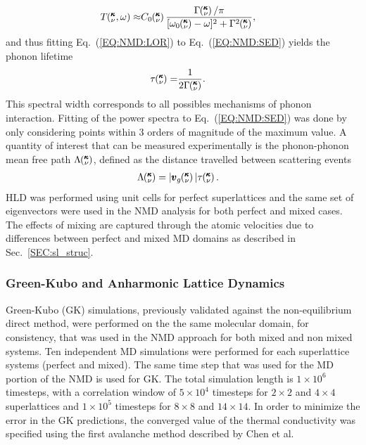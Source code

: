 \documentclass[aps,prb,preprint,preprintnumbers,amsmath,amssymb,floatfix,superscriptaddress]{revtex4}
\newcommand{\kvw}{\mspace{-4.0mu}\left(\mspace{-8.0mu}
\begin{smallmatrix}&\pmb{\kappa} \\&\nu\end{smallmatrix}
\mspace{-2.0mu},\omega\right)}
\newcommand{\kv}{\mspace{-4.0mu}\left(\mspace{-8.0mu}
\begin{smallmatrix}&\pmb{\kappa} \\&\nu\end{smallmatrix}
\mspace{-3.0mu}\right)}
\begin{document}
\begin{equation}\label{EQ:NMD:LOR}
\begin{split}
T\kvw\approx&C_0\kv\frac{\Gamma\kv/\pi}{[\omega_0\kv-\omega]^2+\Gamma^2\kv},
\end{split}
\end{equation}
and thus fitting Eq.~(\ref{EQ:NMD:LOR}) to Eq.~(\ref{EQ:NMD:SED}) yields the phonon lifetime
\begin{equation}\label{EQ:lifetime}
\begin{split}
\tau\kv=&\frac{1}{2\Gamma\kv}.
\end{split}
\end{equation}
This spectral width corresponds to all possibles mechanisms of phonon interaction. Fitting of the power spectra to Eq.~(\ref{EQ:NMD:SED}) was done by only considering points within 3 orders of magnitude of the maximum value. A quantity of interest that can be measured experimentally \cite{Jon} is the phonon-phonon mean free path $\Lambda\kv$, defined as the distance travelled between scattering events \cite{ziman_electrons_2001}
\begin{equation}\label{EQ:M:phonon_mfp}
\begin{split}
\Lambda\kv &= |\pmb{v}_{g}\kv {}| \tau\kv.
\end{split}
\end{equation}
HLD was performed using unit cells for perfect superlattices and the same set of eigenvectors were used in the NMD analysis for both perfect and mixed cases. The effects of mixing are captured through the atomic velocities due to differences between perfect and mixed MD domains as described in Sec.~\ref{SEC:sl_struc}.

\subsubsection{Green-Kubo and Anharmonic Lattice Dynamics}
Green-Kubo (GK) simulations, previously validated against the non-equilibrium direct method,\cite {PhysRevB.79.075316} were performed on the the same molecular domain, for consistency, that was used in the NMD approach for both mixed and non mixed systems. Ten independent MD simulations were performed for each superlattice systems (perfect and mixed). The same time step that was used for the MD portion of the NMD is used for GK. The total  simulation length is $1\times 10^6$ timesteps, with a correlation window of $5\times 10^4$ timesteps for $2 \times 2$ and $4 \times 4$ superlattices and $1\times 10^5$ timesteps for $8 \times 8$ and $14 \times 14$. In order to minimize the error in the GK predictions, the converged value of the thermal conductivity was specified using the first avalanche method described by Chen et al. \cite{Chen20102392}
\end{document}
